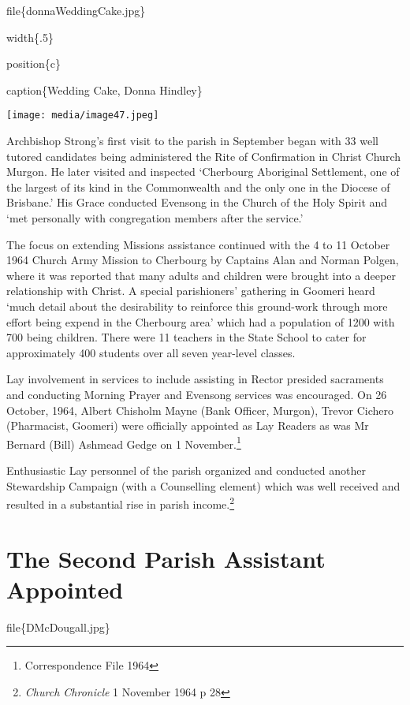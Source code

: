 file\{donnaWeddingCake.jpg\}

width\{.5\}

position\{c\}

caption\{Wedding Cake, Donna Hindley\}

\texttt{[image: media/image47.jpeg]}

Archbishop Strong's first visit to the parish in September began with 33 well tutored candidates being administered the Rite of Confirmation in Christ Church Murgon. He later visited and inspected `Cherbourg Aboriginal Settlement, one of the largest of its kind in the Commonwealth and the only one in the Diocese of Brisbane.' His Grace conducted Evensong in the Church of the Holy Spirit and `met personally with congregation members after the service.'

The focus on extending Missions assistance continued with the 4 to 11 October 1964 Church Army Mission to Cherbourg by Captains Alan and Norman Polgen, where it was reported that many adults and children were brought into a deeper relationship with Christ. A special parishioners' gathering in Goomeri heard `much detail about the desirability to reinforce this ground-work through more effort being expend in the Cherbourg area' which had a population of 1200 with 700 being children. There were 11 teachers in the State School to cater for approximately 400 students over all seven year-level classes.

Lay involvement in services to include assisting in Rector presided sacraments and conducting Morning Prayer and Evensong services was encouraged. On 26 October, 1964, Albert Chisholm Mayne (Bank Officer, Murgon), Trevor Cichero (Pharmacist, Goomeri) were officially appointed as Lay Readers as was Mr Bernard (Bill) Ashmead Gedge on 1 November.\footnote{Correspondence File 1964}

Enthusiastic Lay personnel of the parish organized and conducted another Stewardship Campaign (with a Counselling element) which was well received and resulted in a substantial rise in parish income.\footnote{\emph{Church Chronicle} 1 November 1964 p 28}

\hypertarget{the-second-parish-assistant-appointed}{%
\section{The Second Parish Assistant Appointed}\label{the-second-parish-assistant-appointed}}

file\{DMcDougall.jpg\}

